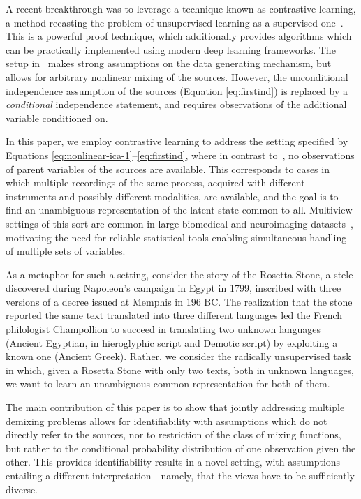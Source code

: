 A recent breakthrough was to leverage a technique known as contrastive learning, a method recasting the problem of unsupervised learning as a supervised one~\cite{gutmann2010noise,hyvarinen2016unsupervised, pmlr-v54-hyvarinen17a, hyvarinen19a}. This is a powerful proof technique, which additionally provides algorithms which can be practically implemented using modern deep learning frameworks.
The setup in~\cite{hyvarinen2016unsupervised, pmlr-v54-hyvarinen17a, hyvarinen19a} makes strong assumptions on the data generating mechanism, but allows for arbitrary nonlinear mixing of the sources. However, the
unconditional
independence assumption of the sources (Equation \ref{eq:firstind}) is replaced by a {\em conditional} independence statement, and requires observations of the additional variable conditioned on.

In this paper, we employ contrastive learning to address the setting specified by Equations \ref{eq:nonlinear-ica-1}--\ref{eq:firstind}, where in contrast to~\cite{hyvarinen19a}, no observations of parent variables of the sources are available. This corresponds to cases in which multiple recordings of the same process, acquired with different instruments and possibly different modalities, are available, and the goal is to find an unambiguous representation of the latent state common to all. Multiview settings of this sort are common in large biomedical and neuroimaging datasets~\cite{allen2012uk, miller2016multimodal, van2013wu, shafto2014cambridge}, motivating the need for reliable statistical tools enabling simultaneous handling of multiple sets of variables.


As a metaphor for such a setting, consider the story of the Rosetta Stone, a stele discovered during Napoleon's campaign in Egypt in 1799, inscribed with three versions of a decree issued at Memphis in 196 BC.
The realization that the stone reported the same text translated into three different languages led the French philologist Champollion to succeed in translating two unknown languages (Ancient Egyptian, in hieroglyphic script and Demotic script) by exploiting a known one (Ancient Greek).
Rather, we consider the radically unsupervised task in which, given a Rosetta Stone with only two texts, both in unknown languages, we want to learn an unambiguous common representation for both of them.









The main contribution of this paper is to show that jointly addressing multiple demixing problems allows for identifiability with assumptions which do not directly refer to the sources, nor to restriction of the class of mixing functions, but rather to the conditional probability distribution of one observation given the other.
This provides identifiability results in a novel setting, with assumptions entailing a different interpretation - namely, that the views have to be sufficiently diverse.




